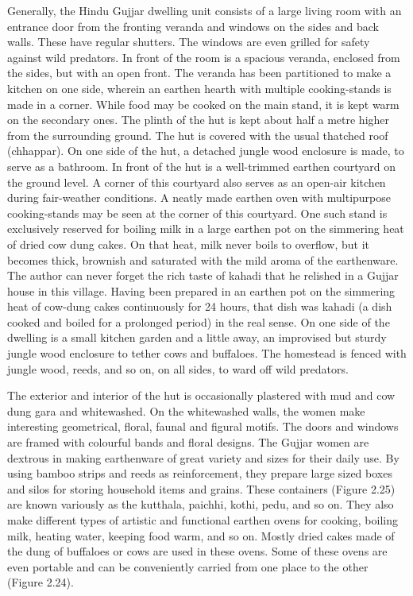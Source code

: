 Generally, the Hindu Gujjar dwelling unit consists of a large living room with an entrance door from the fronting veranda and windows on the sides and back walls. These have regular shutters. The windows are even grilled for safety against wild predators. In front of the room is a spacious veranda, enclosed from the sides, but with an open front. The veranda has been partitioned to make a kitchen on one side, wherein an earthen hearth with multiple cooking-stands is made in a corner. While food may be cooked on the main stand, it is kept warm on the secondary ones. The plinth of the hut is kept about half a metre higher from the surrounding ground. The hut is covered with the usual thatched roof (chhappar). On one side of the hut, a detached jungle wood enclosure is made, to serve as a bathroom. In front of the hut is a well-trimmed earthen courtyard on the ground level. A corner of this courtyard also serves as an open-air kitchen during fair-weather conditions. A neatly made earthen oven with multipurpose cooking-stands may be seen at the corner of this courtyard. One such stand is exclusively reserved for boiling milk in a large earthen pot on the simmering heat of dried cow dung cakes. On that heat, milk never boils to overflow, but it becomes thick, brownish and saturated with the mild aroma of the earthenware. The author can never forget the rich taste of kahadi that he relished in a Gujjar house in this village. Having been prepared in an earthen pot on the simmering heat of cow-dung cakes continuously for 24 hours, that dish was kahadi (a dish cooked and boiled for a prolonged period) in the real sense. On one side of the dwelling is a small kitchen garden and a little away, an improvised but sturdy jungle wood enclosure to tether cows and buffaloes. The homestead is fenced with jungle wood, reeds, and so on, on all sides, to ward off wild predators.

The exterior and interior of the hut is occasionally plastered with mud and cow dung gara and whitewashed. On the whitewashed walls, the women make interesting geometrical, floral, faunal and figural motifs. The doors and windows are framed with colourful bands and floral designs. The Gujjar women are dextrous in making earthenware of great variety and sizes for their daily use. By using bamboo strips and reeds as reinforcement, they prepare large sized boxes and silos for storing household items and grains. These containers (Figure 2.25) are known variously as the kutthala, paichhi, kothi, pedu, and so on. They also make different types of artistic and functional earthen ovens for cooking, boiling milk, heating water, keeping food warm, and so on. Mostly dried cakes made of the dung of buffaloes or cows are used in these ovens. Some of these ovens are even portable and can be conveniently carried from one place to the other (Figure 2.24).

